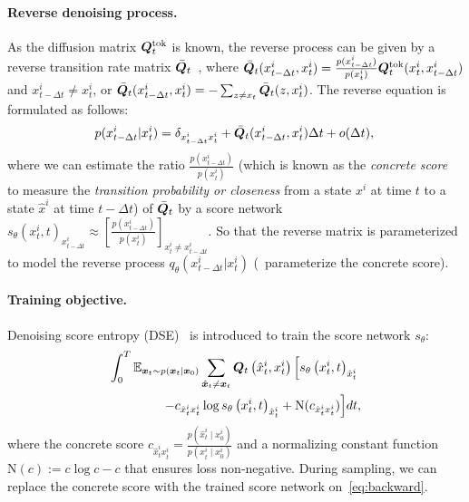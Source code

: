 \paragraph{Reverse denoising process.~~\xspace}
As the diffusion matrix ${\bm{Q}}^\text{tok}_t$ is known, the reverse process can be given by a reverse transition rate matrix $\bar{{\bm{Q}}}_t$~\cite{SCDDM:conf/iclr/SunYDSD23,kelly2011reversibility}, where $\bar{{\bm{Q}}}_t(x^i_{t- \Delta t},x^i_t)=\frac{ p(x^i_{t- \Delta t})}{p(x^i_t)} {\bm{Q}}^\text{tok}_t(x^i_t,x^i_{t- \Delta t})$ and $x^i_{t- \Delta t}\neq x^i_t$, or $\bar{{\bm{Q}}}_t(x^i_{t- \Delta t}, x^i_t) =  - \sum_{z \neq x_t} \bar{{\bm{Q}}}_t(z,x^i_t)$. 
The reverse equation is formulated as follows: 
\begin{equation}
    \label{eq:backward}
    p({x}^i_{t- \Delta t}|x^i_t) =  \delta_{{x}^i_{t- \Delta t}x^i_t} + \bar{{\bm{Q}}}_t({x}^i_{t- \Delta t},x^i_t)\Delta t + o(\Delta t),\\
\end{equation}
where we can estimate the ratio $\frac{p(x^i_{t- \Delta t})}{p(x^i_t)}$ (which is known as the \textit{concrete score}~\cite{SEDD:conf/icml/LouME24,ConcreteScoreMatch:conf/nips/MengCSE22} to measure the \textit{transition probability or closeness} from a state $x^i$ at time $t$  to a state $\hat{x}^i$ at time $t- \Delta t$) of $\bar{{\bm{Q}}}_t$ by a score network $s_\theta({x}^i_t,t)_{x^i_{t- \Delta t}} \approx [\frac{p(x^i_{t- \Delta t})}{p(x^i_t)}]_{x^i_{t}\neq x^i_{t- \Delta t}}$. 
So that the reverse matrix is parameterized to model the reverse process $q_\theta({x}^i_{t- \Delta t}|x^i_t)$ (\ie~parameterize the concrete score). 

\paragraph{Training objective.~~\xspace}
Denoising score entropy (DSE)~\cite{SEDD:conf/icml/LouME24} is introduced to train the score network $s_\theta$:
\begin{equation}
\begin{aligned}
       \int_0^T \mathbb{E}_{\bm{x}_t \sim p\left(\bm{x}_t \mid \bm{x}_0\right)} \sum_{{\hat{\bm{x}}_t} \neq \bm{x}_t} {\bm{Q}}_t\left( \hat{{x}}^i_t,{x}^i_t\right)  \Big[s_\theta\left({x}^i_t, t\right)_{\hat{{x}}^i_t}  & \\
        - c_{\hat{{x}}^i_t {x}^i_t} \log s_\theta\left({x}^i_t, t\right)_{\hat{{x}}^i_t}+  \text{N}(c_{\hat{{x}}^i_t {x}^i_t})\Big] dt &,
\end{aligned}
\label{eq:score_entropy}
\end{equation}
where the concrete score $c_{\hat{{x}}^i_t {x}^i_t} = \frac{p\left({\hat{{x}}^i_t} \mid {x}^i_0\right)}{p\left({x}^i_t \mid {x}^i_0\right)}$ and a normalizing constant function $\text{N}(c):= c \log c - c$ that ensures loss non-negative. 
During sampling, we can replace the concrete score with the trained score network on~\cref{eq:backward}.



